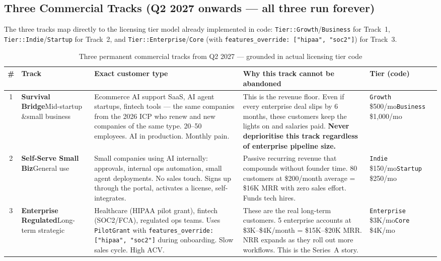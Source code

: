\subsection*{Three Commercial Tracks (Q2 2027 onwards --- all three run forever)}

The three tracks map directly to the licensing tier model already implemented
in code: \texttt{Tier::Growth}/\texttt{Business} for Track~1,
\texttt{Tier::Indie}/\texttt{Startup} for Track~2, and
\texttt{Tier::Enterprise}/\texttt{Core} (with \texttt{features\_override:
["hipaa", "soc2"]}) for Track~3.

\begin{table}[H]
\centering
\renewcommand{\arraystretch}{1.75}
\begin{tabularx}{\textwidth}{@{}clXXl@{}}
\toprule
\textbf{\#} & \textbf{Track} & \textbf{Exact customer type} &
\textbf{Why this track cannot be abandoned} & \textbf{Tier (code)} \\
\midrule
1 & \textbf{Survival Bridge}\newline Mid-startup \&\newline small business &
  Ecommerce AI support SaaS, AI agent startups, fintech tools --- the
  same companies from the 2026 ICP who renew and new companies of the same
  type. 20--50 employees. AI in production. Monthly pain. & This is the
  revenue floor. Even if every enterprise deal slips by 6 months, these
  customers keep the lights on and salaries paid. \textbf{Never deprioritise
  this track regardless of enterprise pipeline size.} &
  \texttt{Growth} \$500/mo\newline \texttt{Business} \$1,000/mo \\
\midrule
2 & \textbf{Self-Serve Small Biz}\newline General use &
  Small companies using AI internally: approvals, internal ops automation,
  small agent deployments. No sales touch. Signs up through the portal,
  activates a license, self-integrates. & Passive recurring revenue that
  compounds without founder time. 80 customers at \$200/month average =
  \$16K MRR with zero sales effort. Funds tech hires. &
  \texttt{Indie} \$150/mo\newline \texttt{Startup} \$250/mo \\
\midrule
3 & \textbf{Enterprise Regulated}\newline Long-term strategic &
  Healthcare (HIPAA pilot grant), fintech (SOC2/FCA), regulated ops
  teams. Uses \texttt{PilotGrant} with \texttt{features\_override:
  ["hipaa", "soc2"]} during onboarding. Slow sales cycle. High ACV. &
  These are the real long-term customers. 5 enterprise accounts at
  \$3K--\$4K/month = \$15K--\$20K MRR. NRR expands as they roll out
  more workflows. This is the Series~A story. &
  \texttt{Enterprise} \$3K/mo\newline \texttt{Core} \$4K/mo \\
\bottomrule
\end{tabularx}
\caption{Three permanent commercial tracks from Q2 2027 --- grounded in actual licensing tier code}
\end{table}

